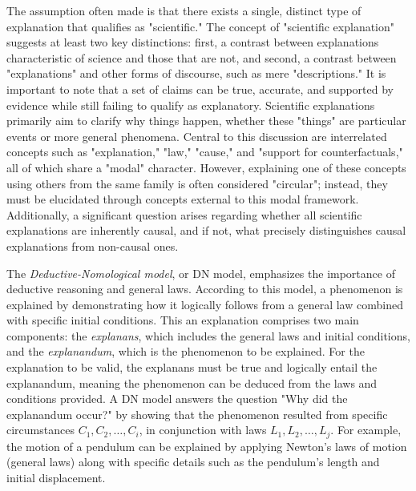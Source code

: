 The assumption often made is that there exists a single, distinct type of explanation that qualifies as "scientific." The concept of "scientific explanation" suggests at least two key distinctions: first, a contrast between explanations characteristic of science and those that are not, and second, a contrast between "explanations" and other forms of discourse, such as mere "descriptions." It is important to note that a set of claims can be true, accurate, and supported by evidence while still failing to qualify as explanatory. Scientific explanations primarily aim to clarify why things happen, whether these "things" are particular events or more general phenomena. Central to this discussion are interrelated concepts such as "explanation," "law," "cause," and "support for counterfactuals," all of which share a "modal" character. However, explaining one of these concepts using others from the same family is often considered "circular"; instead, they must be elucidated through concepts external to this modal framework. Additionally, a significant question arises regarding whether all scientific explanations are inherently causal, and if not, what precisely distinguishes causal explanations from non-causal ones.

The \emph{Deductive-Nomological model}, or DN model, emphasizes the importance of deductive reasoning and general laws. According to this model, a phenomenon is explained by demonstrating how it logically follows from a general law combined with specific initial conditions. This an explanation comprises two main components: the \emph{explanans}, which includes the general laws and initial conditions, and the \emph{explanandum}, which is the phenomenon to be explained. For the explanation to be valid, the explanans must be true and logically entail the explanandum, meaning the phenomenon can be deduced from the laws and conditions provided. A DN model answers the question "Why did the explanandum occur?" by showing that the phenomenon resulted from specific circumstances $C_1, C_2, \ldots, C_i$, in conjunction with laws $L_1, L_2, \ldots, L_j$. For example, the motion of a pendulum can be explained by applying Newton's laws of motion (general laws) along with specific details such as the pendulum's length and initial displacement.

